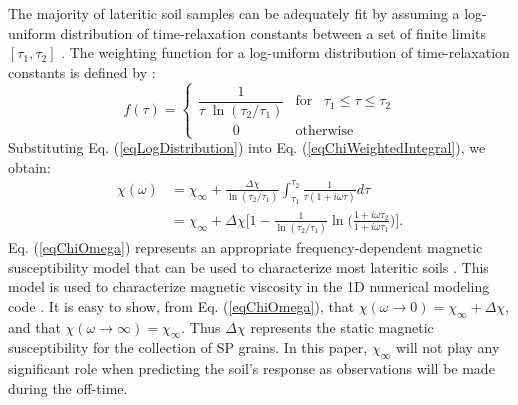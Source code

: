 \documentclass[onecolumn]{IEEEtran} %
\begin{document}
The majority of lateritic soil samples can be
adequately fit by assuming a log-uniform distribution of
time-relaxation constants between a set of finite limits $[\tau_1,
\tau_2]$ \cite{Dabas1992,Mullins1973,Worm1998,Igel2012}. The
weighting function for a log-uniform distribution of time-relaxation
constants is defined by
\cite{Dabas1992,Mullins1973,Billings2003,Das2006}:
\begin{equation}
\label{eqLogDistribution}
f({\tau}) =
\begin{cases}
\dfrac{1}{\tau \; \ln(\tau_2/\tau_1)} & \textrm{for} \; \; \; \tau_1 \leq \tau \leq \tau_2 \\
\; \; \; \; \; \; \; \; \; 0 & \textrm{otherwise}
\end{cases}
\end{equation}
Substituting Eq. (\ref{eqLogDistribution}) into Eq. (\ref{eqChiWeightedIntegral}), we obtain:
\begin{equation}
\begin{split}
\chi (\omega) & = \chi_\infty + \frac{\Delta \chi}{\ln (\tau_2 /\tau_1)} \int_{\tau_1}^{\tau_2} \frac{1}{\tau (1 + i\omega \tau)} d\tau  \\
&= \chi_\infty + \Delta \chi \Bigg [ 1 - \frac{1}{\ln
(\tau_2/\tau_1)} \ln \Bigg ( \frac{1 + i\omega\tau_2}{1 +
i\omega\tau_1} \Bigg ) \Bigg ].
\end{split}
 \label{eqChiOmega}
\end{equation}
Eq. (\ref{eqChiOmega}) represents an appropriate frequency-dependent
magnetic susceptibility model that can be used to characterize most
lateritic soils
\cite{Mullins1973,Lee1984,Worm1998,Dabas1992,Pasion2007}.
This model is used to characterize magnetic
viscosity in the 1D numerical modeling code \cite{EM1DTM}. It is easy to show,
from Eq. (\ref{eqChiOmega}), that $\chi (\omega \rightarrow 0) =
\chi_\infty + \Delta \chi$, and that $\chi (\omega\rightarrow
\infty) = \chi_\infty$. Thus $\Delta \chi$
represents the static magnetic susceptibility for the collection of
SP grains. In this paper, $\chi_\infty$ will not play any
significant role when predicting the soil's response as observations
will be made during the off-time.
\end{document}
